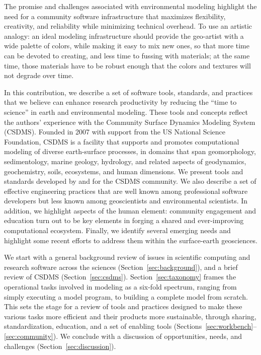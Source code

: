 \documentclass[12pt]{amsart}
\begin{document}
The promise and challenges associated with environmental modeling highlight the need for a community software infrastructure that maximizes flexibility, creativity, and reliability while minimizing technical overhead. To use an artistic analogy: an ideal modeling infrastructure should provide the geo-artist with a wide palette of colors, while making it easy to mix new ones, so that more time can be devoted to creating, and less time to fussing with materials; at the same time, those materials have to be robust enough that the colors and textures will not degrade over time.

In this contribution, we describe a set of software tools, standards, and practices that we believe can enhance research productivity by reducing the ``time to science'' in earth and environmental modeling. These tools and concepts reflect the authors' experience with the Community Surface Dynamics Modeling System (CSDMS). Founded in 2007 with support from the US National Science Foundation, CSDMS is a facility that supports and promotes computational modeling of diverse earth-surface processes, in domains that span geomorphology, sedimentology, marine geology, hydrology, and related aspects of geodynamics, geochemistry, soils, ecosystems, and human dimensions. We present tools and standards developed by and for the CSDMS community. We also describe a set of effective engineering practices that are well known among professional software developers but less known among geoscientists and environmental scientists. In addition, we highlight aspects of the human element: community engagement and education turn out to be key elements in forging a shared and ever-improving computational ecosystem. Finally, we identify several emerging needs and highlight some recent efforts to address them within the surface-earth geosciences.

We start with a general background review of issues in scientific computing and research software across the sciences (Section~\ref{sec:background}), and a brief review of CSDMS (Section~\ref{sec:csdms}). Section~\ref{sec:taxonomy} frames the operational tasks involved in modeling as a six-fold spectrum, ranging from simply executing a model program, to building a complete model from scratch. This sets the stage for a review of tools and practices designed to make these various tasks more efficient and their products more sustainable, through sharing, standardization, education, and a set of enabling tools (Sections~\ref{sec:workbench}--\ref{sec:community}). We conclude with a discussion of opportunities, needs, and challenges (Section~\ref{sec:discussion}).
\end{document}
